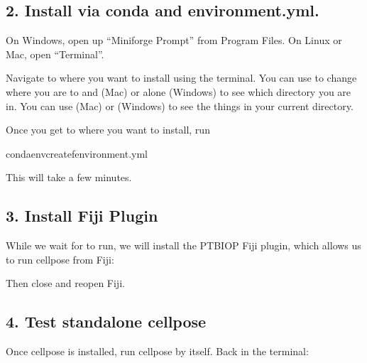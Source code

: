 \documentclass[letterpaper,10pt,english]{jupyterBook}
\begin{document}
\subsection{2. Install via conda and environment.yml.}
\label{\detokenize{cellpose:install-via-conda-and-environment-yml}}
\sphinxAtStartPar
On Windows, open up “Miniforge Prompt” from Program Files. On Linux or Mac, open “Terminal”.

\sphinxAtStartPar
Navigate to where you want to install using the terminal. You can use  to change where you are to  and  (Mac) or  alone (Windows) to see which directory you are in. You can use  (Mac) or  (Windows) to see the things in your current directory.

\sphinxAtStartPar
Once you get to where you want to install, run

\begin{sphinxVerbatim}[commandchars=\\\{\}]
condaenvcreate\PYGZhy{}fenvironment.yml
\end{sphinxVerbatim}

\sphinxAtStartPar
This will take a few minutes.


\subsection{3. Install Fiji Plugin}
\label{\detokenize{cellpose:install-fiji-plugin}}
\sphinxAtStartPar
While we wait for  to run, we will install the PTBIOP Fiji plugin, which allows us to run cellpose from Fiji:

\sphinxAtStartPar
{}

\sphinxAtStartPar
{}

\sphinxAtStartPar
{}

\sphinxAtStartPar
Then close and reopen Fiji.


\subsection{4. Test standalone cellpose}
\label{\detokenize{cellpose:test-standalone-cellpose}}
\sphinxAtStartPar
Once cellpose is installed, run cellpose by itself. Back in the terminal:
\end{document}
